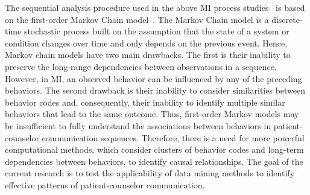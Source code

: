 The sequential analysis procedure used in the above MI process studies~\cite{moyers2006therapist, catley2006adherence, thrasher2006motivational, mccambridge2011fidelity} is based on the first-order Markov Chain model~\cite{moyers2006therapist, moyers2009session, gaume2010counselor}. The Markov Chain model is a discrete-time stochastic process built on the assumption that the state of a system or condition changes over time and only depends on the previous event. Hence, Markov chain models have two main drawbacks. The first is their inability to preserve the long-range dependencies between observations in a sequence. However, in MI, an observed behavior can be influenced by any of the preceding behaviors. The second drawback is their inability to consider similarities between behavior codes and, consequently, their inability to identify multiple similar behaviors that lead to the same outcome. Thus, first-order Markov models may be insufficient to fully understand the associations between behaviors in patient-counselor communication sequences. Therefore, there is a need for more powerful computational methods, which consider clusters of behavior codes and long-term dependencies between behaviors, to identify causal relationships. The goal of the current research is to test the applicability of data mining methods to identify effective patterns of patient-counselor communication.

